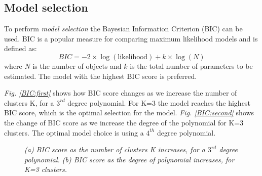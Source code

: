 \subsection*{Model selection}
To perform \emph{model selection} the Bayesian Information Criterion (BIC) \citep{Schwarz1978} can be used. BIC is a popular measure for comparing maximum likelihood models and is defined as:
\begin{equation}
	BIC = -2 \times \log (\text{likelihood}) + k \times \log (N)
\end{equation}
where $N$ is the number of objects and $k$ is the total number of parameters to be estimated. The model with the highest BIC score is preferred.

\emph{Fig. \ref{BIC:first}} shows how BIC score changes as we increase the number of clusters K, for a $3^{rd}$ degree polynomial. For K=3 the model reaches the highest BIC score, which is the optimal selection for the model. \emph{Fig. \ref{BIC:second}} shows the change of BIC score as we increase the degree of the polynomial for K=3 clusters. The optimal model choice is using a $4^{th}$ degree polynomial.
\begin{figure}[ht!]
     \begin{center}
    \end{center}
    \caption{\emph{(a) BIC score as the number of clusters K increases, for a $3^{rd}$ degree polynomial. (b) BIC score as the degree of polynomial increases, for K=3 clusters.}}
   \label{BIC-pic}
\end{figure}